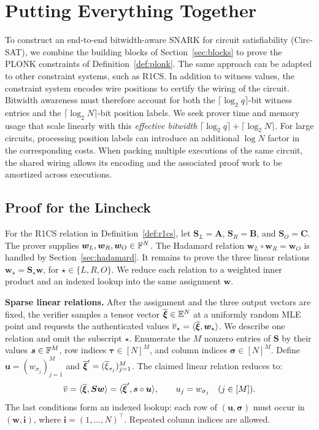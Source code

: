 \section{Putting Everything Together}
\label{sec:together}

To construct an end-to-end bitwidth-aware SNARK for circuit
satisfiability (Circ-SAT), we combine the building blocks
of Section~\ref{sec:blocks} to prove the PLONK constraints
of Definition~\ref{def:plonk}.
The same approach can be adapted to other constraint systems,
such as R1CS.
In addition to witness values, the constraint system encodes
wire positions to certify the wiring of the circuit.
Bitwidth awareness must therefore account for both the
\(\lceil\log_2 q\rceil\)-bit witness entries and the
\(\lceil\log_2 N\rceil\)-bit position labels.
We seek prover time and memory usage that scale linearly
with this \emph{effective bitwidth} \(\lceil\log_2 q\rceil + \lceil\log_2 N\rceil\).
For large circuits, processing position labels can introduce
an additional \(\log N\) factor in the corresponding costs.
When packing multiple executions of the same circuit,
the shared wiring allows its encoding and the associated
proof work to be amortized across executions.

\iffalse
\subsection{Proof for the Lincheck}
\label{sec:lincheck}

For the R1CS relation in Definition~\ref{def:r1cs}, let
\(\bm S_L=\bm A\), \(\bm S_R=\bm B\), and \(\bm S_O=\bm C\).
The prover supplies \(\bm w_L,\bm w_R,\bm w_O\in{\mathbb{F}}^N\).
The Hadamard relation \(\bm w_L\circ\bm w_R=\bm w_O\) is handled
by Section~\ref{sec:hadamard}. It remains to prove the three
linear relations \(\bm w_\star=\bm S_\star\bm w\), for
\(\star\in\{L,R,O\}\).
We reduce each relation to a weighted inner product and an indexed
lookup into the same assignment \(\bm w\).

\smallskip\noindent\textbf{Sparse linear relations.}
After the assignment and the three output vectors are fixed,
the verifier samples a tensor vector
\(\overline{\bm\xi}\in\mathbb{E}^N\) at a uniformly random
MLE point and requests the authenticated values
\(\overline{v}_\star=\langle\overline{\bm\xi},\bm w_\star\rangle\).
We describe one relation and omit the subscript \(\star\).
Enumerate the \(M\) nonzero entries of \(\bm S\) by their values
\(\bm s\in{\mathbb{F}}^M\), row indices \(\bm\tau\in[N]^M\), and
column indices \(\bm\sigma\in[N]^M\).
Define \(\bm u=(w_{\sigma_j})_{j=1}^M\) and
\(\overline{\bm\xi}'=(\overline{\xi}_{\tau_j})_{j=1}^M\).
The claimed linear relation reduces to:
\[
    \overline{v}
    =\langle\overline{\bm\xi},\bm S\bm w\rangle
    =\langle\overline{\bm\xi}',\bm s\circ\bm u\rangle,
    \qquad
    u_j=w_{\sigma_j}\quad(j\in[M]).
\]
The last conditions form an indexed lookup: each row of
\((\bm u,\bm\sigma)\) must occur in \((\bm w,\bm i)\), where
\(\bm i=(1,\ldots,N)^\top\). Repeated column indices are allowed.

